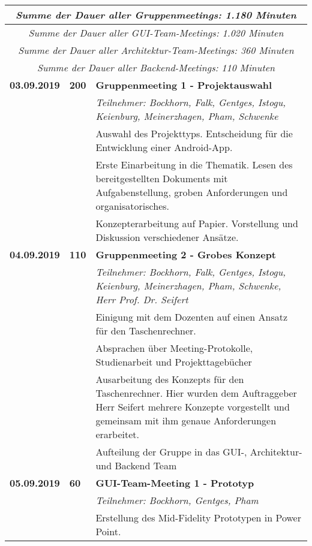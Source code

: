 {{\begin{longtable}{|l|l|p{11cm}|}
	\multicolumn{3}{|c|}{\textit{Summe der Dauer aller Gruppenmeetings: 1.180 Minuten}}
	\\ \hline\hline
	\multicolumn{3}{|c|}{\textit{Summe der Dauer aller GUI-Team-Meetings: 1.020 Minuten}}
	\\ \hline\hline
	\multicolumn{3}{|c|}{\textit{Summe der Dauer aller Architektur-Team-Meetings: 360 Minuten}}
	\\ \hline\hline
	\multicolumn{3}{|c|}{\textit{Summe der Dauer aller Backend-Meetings: 110 Minuten}}
	\\ \hline
	\endlastfoot
	
		\textbf{03.09.2019} 
			& \hfill\textbf{200} & \textbf{Gruppenmeeting 1 - Projektauswahl}
			\\ & &
			\small{\textit{Teilnehmer: Bockhorn, Falk, Gentges, Istogu, Keienburg, Meinerzhagen, Pham, Schwenke}}
			\\ & &
			Auswahl des Projekttyps. Entscheidung für die Entwicklung einer Android-App.
			\\ & &
			Erste Einarbeitung in die Thematik. Lesen des bereitgestellten Dokuments mit Aufgabenstellung, groben Anforderungen und organisatorisches. 
			\\ & &
			Konzepterarbeitung auf Papier. Vorstellung und Diskussion verschiedener Ansätze.
	\\\hline
		\textbf{04.09.2019} 
			& \textbf{\hfill110} & \textbf{Gruppenmeeting 2 - Grobes Konzept}
			\\ & &
			\small{\textit{Teilnehmer: Bockhorn, Falk, Gentges, Istogu, Keienburg, Meinerzhagen, Pham, Schwenke, Herr Prof. Dr. Seifert}}
			\\ & &
			Einigung mit dem Dozenten auf einen Ansatz für den Taschenrechner.
			\\ & &
			Absprachen über Meeting-Protokolle, Studienarbeit und Projekttagebücher
			\\ & &
			Ausarbeitung des Konzepts für den Taschenrechner. Hier wurden dem Auftraggeber Herr Seifert mehrere Konzepte vorgestellt und gemeinsam mit ihm genaue Anforderungen erarbeitet.
			\\ & &
			Aufteilung der Gruppe in das GUI-, Architektur- und Backend Team
	\\\hline
		\textbf{05.09.2019} 
			& \textbf{\hfill60} & \textbf{GUI-Team-Meeting 1 - Prototyp} 
			\\ & &
			\small{\textit{Teilnehmer: Bockhorn, Gentges, Pham}}
			\\ & &
			Erstellung des Mid-Fidelity Prototypen in Power Point.			
		\\ \cline{2-3}

\end{longtable}}}
